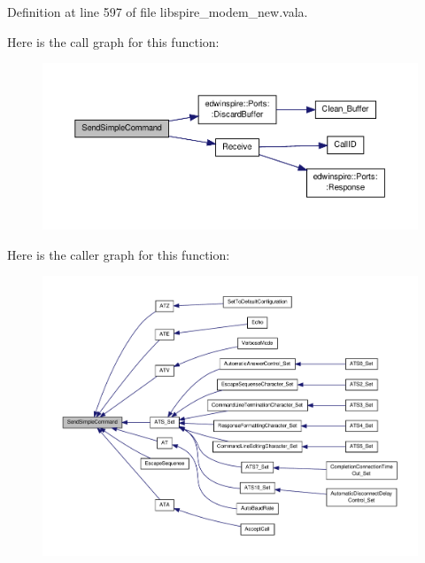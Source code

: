 Definition at line 597 of file libspire\-\_\-modem\-\_\-new.\-vala.



Here is the call graph for this function\-:\nopagebreak
\begin{figure}[H]
\begin{center}
\leavevmode
\includegraphics[width=350pt]{classedwinspire_1_1_ports_1_1_modem_a8556df8675e2894fa7afdb9dae873233_cgraph}
\end{center}
\end{figure}




Here is the caller graph for this function\-:\nopagebreak
\begin{figure}[H]
\begin{center}
\leavevmode
\includegraphics[width=350pt]{classedwinspire_1_1_ports_1_1_modem_a8556df8675e2894fa7afdb9dae873233_icgraph}
\end{center}
\end{figure}


